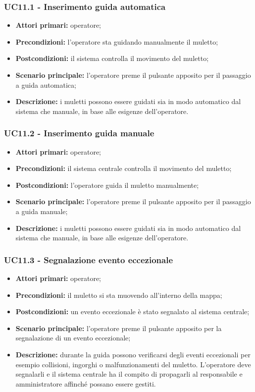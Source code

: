 \subsubsection{UC11.1 - Inserimento guida automatica}
\begin{itemize}
	\item 	\textbf{Attori primari:} operatore;
	\item 	\textbf{Precondizioni:} l'operatore sta guidando manualmente il muletto;
	\item 	\textbf{Postcondizioni:} il sistema controlla il movimento del muletto;
	\item 	\textbf{Scenario principale:} l'operatore preme il pulsante apposito per il passaggio a guida automatica;
	\item 	\textbf{Descrizione:} i muletti possono essere guidati sia in modo automatico dal sistema che manuale, in base alle esigenze dell'operatore.
\end{itemize}

\subsubsection{UC11.2 - Inserimento guida manuale}
\begin{itemize}
	\item 	\textbf{Attori primari:} operatore;
	\item 	\textbf{Precondizioni:} il sistema centrale controlla il movimento del muletto;
	\item 	\textbf{Postcondizioni:} l'operatore guida il muletto manualmente; 
	\item 	\textbf{Scenario principale:} l'operatore preme il pulsante apposito per il passaggio a guida manuale;
	\item 	\textbf{Descrizione:} i muletti possono essere guidati sia in modo automatico dal sistema che manuale, in base alle esigenze dell'operatore.
\end{itemize}

\subsubsection{UC11.3 - Segnalazione evento eccezionale}
\begin{itemize}
	\item 	\textbf{Attori primari:} operatore;
	\item 	\textbf{Precondizioni:} il muletto si sta muovendo all'interno della mappa;
	\item 	\textbf{Postcondizioni:} un evento eccezionale è stato segnalato al sistema centrale; 
	\item 	\textbf{Scenario principale:} l'operatore preme il pulsante apposito per la segnalazione di un evento eccezionale;
	\item 	\textbf{Descrizione:} durante la guida possono verificarsi degli eventi eccezionali per esempio collisioni, ingorghi o malfunzionamenti del muletto. L'operatore deve segnalarli e il sistema centrale ha il compito di propagarli al responsabile e amministratore affinché possano essere gestiti.

\end{itemize}

